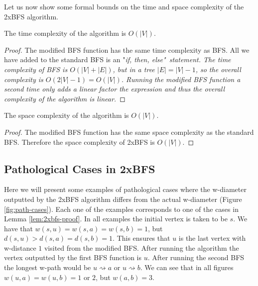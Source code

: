 Let us now show some formal bounds on the time and space complexity of the 2xBFS algorithm.

\begin{lem} The time complexity of the algorithm is $O(|V|)$. \end{lem}

\begin{proof}
    The modified BFS function has the same time complexity as BFS. All we have added to the standard BFS is an "\em if, then, else\em"~statement. The time complexity of BFS is $O(|V| + |E|)$, but in a tree $|E| = |V| - 1$, so the overall complexity is $O(2|V| - 1) = O(|V|)$.
    Running the modified BFS function a second time only adds a linear factor the expression and thus the overall complexity of the algorithm is linear.
\end{proof}

\begin{lem} The space complexity of the algorithm is $O(|V|)$. \end{lem}

\begin{proof}
    The modified BFS function has the same space complexity as the standard BFS. Therefore the space complexity of 2xBFS is $O(|V|)$.
\end{proof}

\subsection{Pathological Cases in 2xBFS}

Here we will present some examples of pathological cases where the w-diameter outputted by the 2xBFS algorithm differs from the actual w-diameter (Figure \ref{fig:path-cases}). Each one of the examples corresponds to one of the cases in Lemma \ref{lem:2xbfs-proof}. In all examples the initial vertex is taken to be $s$. We have that $w(s, u) = w(s, a) = w(s, b) = 1$, but $d(s, u) > d(s, a) = d(s, b) = 1$. This ensures that $u$ is the last vertex with w-distance $1$ visited from the modified BFS. After running the algorithm the vertex outputted by the first BFS function is $u$. After running the second BFS the longest w-path would be $u \rightsquigarrow a$ or $u \rightsquigarrow b$. We can see that in all figures $w(u, a) = w(u, b) = 1 \text{ or } 2$, but $w(a, b) = 3$.


